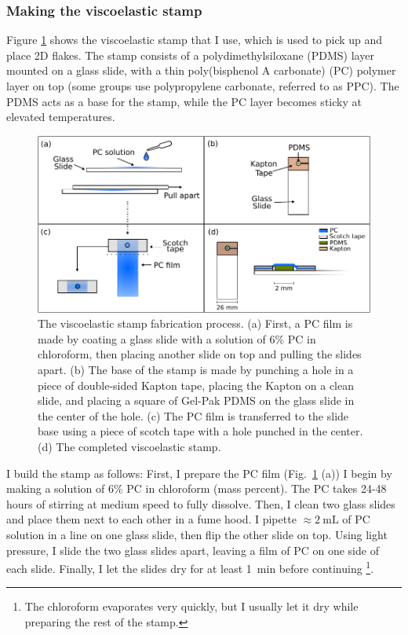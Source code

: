 \documentclass[double,12pt,1in,seploa]{beavtex}
\let\Oldsubsubsection\subsubsection
\renewcommand{\subsubsection}{\FloatBarrier\Oldsubsubsection}
\begin{document}
\subsubsection{Making the viscoelastic stamp} \label{making the PC stamp section}

Figure \ref{stamp diagram} shows the viscoelastic stamp that I use, which is used to pick up and place 2D flakes. The stamp consists of a polydimethylsiloxane (PDMS) layer mounted on a glass slide, with a thin poly(bisphenol A carbonate) (PC) polymer layer on top (some groups use polypropylene carbonate, referred to as PPC). The PDMS acts as a base for the stamp, while the PC layer becomes sticky at elevated temperatures.


\begin{figure}
    \includegraphics[width = 1\textwidth]{stamp making diagram.pdf}
    \caption{The viscoelastic stamp fabrication process. (a) First, a PC film is made by coating a glass slide with a solution of 6\% PC in chloroform, then placing another slide on top and pulling the slides apart. (b) The base of the stamp is made by punching a hole in a piece of double-sided Kapton tape, placing the Kapton on a clean slide, and placing a square of Gel-Pak PDMS on the glass slide in the center of the hole. (c) The PC film is transferred to the slide base using a piece of scotch tape with a hole punched in the center. (d) The completed viscoelastic stamp.}
    \label{stamp diagram}
\end{figure}


I build the stamp as follows: First, I prepare the PC film (Fig.\ \ref{stamp diagram} (a)) I begin by making a solution of 6\% PC in chloroform (mass percent). The PC takes 24-48 hours of stirring at medium speed to fully dissolve. Then, I clean two glass slides and place them next to each other in a fume hood. I pipette $\approx \SI{2}{\milli\liter}$ of PC solution in a line on one glass slide, then flip the other slide on top. Using light pressure, I slide the two glass slides apart, leaving a film of PC on one side of each slide. Finally, I let the slides dry for at least \SI{1}{\minute} before continuing \footnote{The chloroform evaporates very quickly, but I usually let it dry while preparing the rest of the stamp.}.
\end{document}
